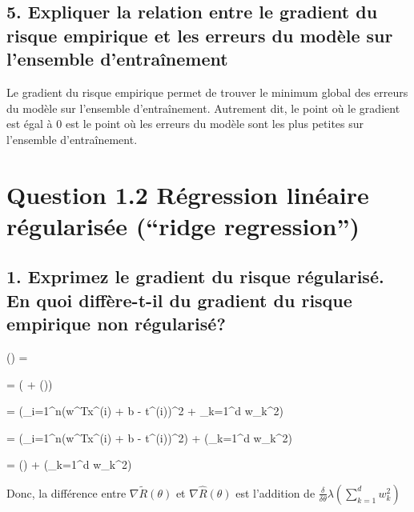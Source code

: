 \documentclass[12pt]{article}
\newenvironment{eqs*}{\begin{equation*}\begin{aligned}}{\end{aligned}\end{equation*}}
\begin{document}
\subsection{5. Expliquer la relation entre le gradient du risque empirique et les erreurs du modèle sur l'ensemble d'entraînement}
	Le gradient du risque empirique permet de trouver le minimum global des erreurs du modèle sur l'ensemble d'entraînement. Autrement dit,
	le point où le gradient est égal à 0 est le point où les erreurs du modèle sont les plus petites sur l'ensemble d'entraînement.


\section{Question 1.2 Régression linéaire régularisée (“ridge regression”)}

\subsection{1. Exprimez le gradient du risque régularisé. En quoi diffère-t-il du gradient du risque empirique non régularisé?}

	\begin{eqs*}
		\nabla{}(\theta) = 
	\end{eqs*}

	\begin{eqs*}
		= \frac{\delta}{\delta\theta}( + \lambda{}(\theta))
	\end{eqs*}

	\begin{eqs*}
		= \frac{\delta}{\delta\theta}(\sum_{i=1}^{n}(w^{T}x^{(i)} + b - t^{(i)})^{2} + \lambda\sum_{k=1}^{d} w_{k}^{2})
	\end{eqs*}

	\begin{eqs*}
		= \frac{\delta}{\delta\theta}(\sum_{i=1}^{n}(w^{T}x^{(i)} + b - t^{(i)})^{2}) + \frac{\delta}{\delta\theta}(\lambda\sum_{k=1}^{d} w_{k}^{2})
	\end{eqs*}

	\begin{eqs*}
		= \nabla{}(\theta) + \frac{\delta}{\delta\theta}\lambda(\sum_{k=1}^{d} w_{k}^{2})
	\end{eqs*}	
	
	Donc, la différence entre $\nabla\widetilde{R}(\theta)$ et $\nabla\hat{R}(\theta)$ est l'addition de $\frac{\delta}{\delta\theta}\lambda(\sum_{k=1}^{d} w_{k}^{2})$
\end{document}
